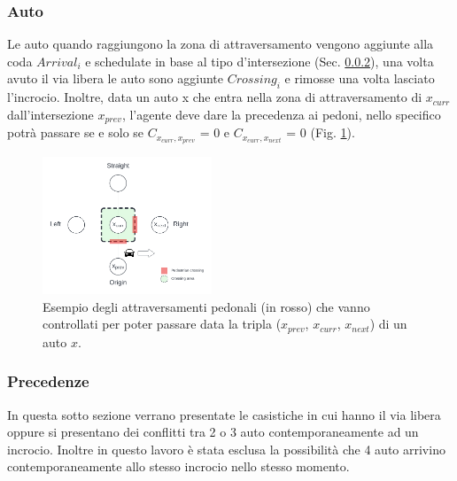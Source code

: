 \subsubsection{Auto}


Le auto quando raggiungono la zona di attraversamento vengono aggiunte alla coda $\textit{Arrival}_i$ e schedulate
in base al tipo d'intersezione (Sec. \ref{subsubsec:precedenze}), una volta avuto il via libera le auto sono aggiunte $\textit{Crossing}_i$ 
e rimosse una volta lasciato l'incrocio.
%
Inoltre, data un auto x che entra nella zona di attraversamento di $x_{curr}$ dall'intersezione $x_{prev}$,
l'agente deve dare la precedenza ai pedoni, nello specifico potrà passare
 se e solo se $C_{x_{curr},x_{prev}}$ = 0 e $C_{x_{curr},x_{next}}$ = 0 (Fig. \ref{fig:auto-ped-crossing}).

\begin{figure}[ht]
    \centering
    \includegraphics[width=0.45\textwidth]{images/crossing_auto_ped_crossing}
    \caption{Esempio degli attraversamenti pedonali (in rosso) che vanno controllati 
    per poter passare data la tripla ($x_{prev}$, $x_{curr}$, $x_{next}$) di un auto $x$.}
    \label{fig:auto-ped-crossing}
\end{figure}


\newpage



\subsubsection{Precedenze}
\label{subsubsec:precedenze}
In questa sotto sezione verrano presentate le casistiche in cui hanno il via libera oppure si presentano dei conflitti tra 2 o 3 auto contemporaneamente ad un incrocio.
Inoltre in questo lavoro è stata esclusa la possibilità che 4 auto arrivino contemporaneamente allo stesso incrocio nello stesso momento.

